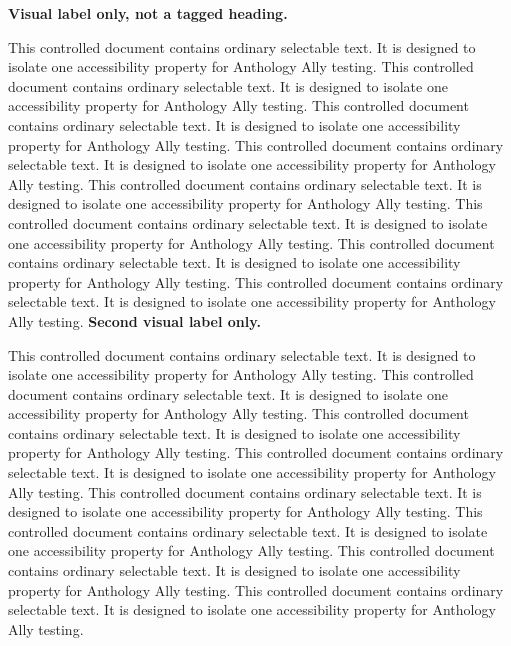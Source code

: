 \documentclass[11pt]{article}
\begin{document}
\textbf{Visual label only, not a tagged heading.}\par This controlled document contains ordinary selectable text. It is designed to isolate one accessibility property for Anthology Ally testing. This controlled document contains ordinary selectable text. It is designed to isolate one accessibility property for Anthology Ally testing. This controlled document contains ordinary selectable text. It is designed to isolate one accessibility property for Anthology Ally testing. This controlled document contains ordinary selectable text. It is designed to isolate one accessibility property for Anthology Ally testing. This controlled document contains ordinary selectable text. It is designed to isolate one accessibility property for Anthology Ally testing. This controlled document contains ordinary selectable text. It is designed to isolate one accessibility property for Anthology Ally testing. This controlled document contains ordinary selectable text. It is designed to isolate one accessibility property for Anthology Ally testing. This controlled document contains ordinary selectable text. It is designed to isolate one accessibility property for Anthology Ally testing. \newpage\textbf{Second visual label only.}\par This controlled document contains ordinary selectable text. It is designed to isolate one accessibility property for Anthology Ally testing. This controlled document contains ordinary selectable text. It is designed to isolate one accessibility property for Anthology Ally testing. This controlled document contains ordinary selectable text. It is designed to isolate one accessibility property for Anthology Ally testing. This controlled document contains ordinary selectable text. It is designed to isolate one accessibility property for Anthology Ally testing. This controlled document contains ordinary selectable text. It is designed to isolate one accessibility property for Anthology Ally testing. This controlled document contains ordinary selectable text. It is designed to isolate one accessibility property for Anthology Ally testing. This controlled document contains ordinary selectable text. It is designed to isolate one accessibility property for Anthology Ally testing. This controlled document contains ordinary selectable text. It is designed to isolate one accessibility property for Anthology Ally testing. 
\end{document}
